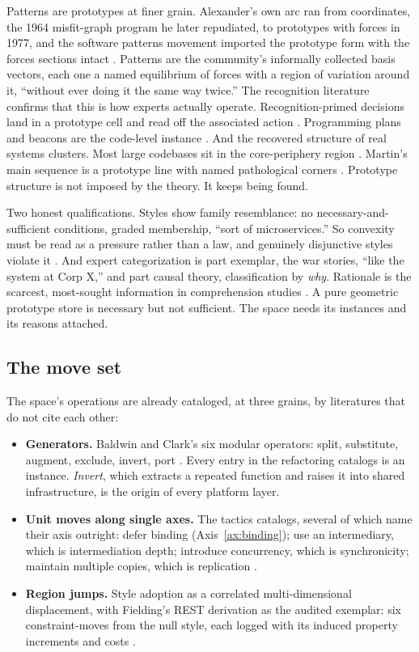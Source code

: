 \documentclass[11pt,oneside]{article}
\theoremstyle{definition}
\begin{document}
Patterns are prototypes at finer grain. Alexander's own arc ran from coordinates, the 1964
misfit-graph program he later repudiated, to prototypes with forces in 1977, and the software
patterns movement imported the prototype form with the forces sections intact
\cite{alexander1977,gamma1994}. Patterns are the community's informally collected basis vectors,
each one a named equilibrium of forces with a region of variation around it, ``without ever
doing it the same way twice.'' The recognition literature confirms that this is how experts
actually operate. Recognition-primed decisions land in a prototype cell and read off the
associated action \cite{klein1998}. Programming plans and beacons are the code-level instance
\cite{soloway1984}. And the recovered structure of real systems clusters. Most large codebases
sit in the core-periphery region \cite{baldwin2014}. Martin's main sequence is a prototype line
with named pathological corners \cite{martin2002}. Prototype structure is not imposed by the
theory. It keeps being found.

Two honest qualifications. Styles show family resemblance: no necessary-and-sufficient
conditions, graded membership, ``sort of microservices.'' So convexity must be read as a
pressure rather than a law, and genuinely disjunctive styles violate it \cite{hernandez2017}.
And expert categorization is part exemplar, the war stories, ``like the system at Corp X,'' and
part causal theory, classification by \emph{why}. Rationale is the scarcest, most-sought
information in comprehension studies \cite{latoza2010}. A pure geometric prototype store is
necessary but not sufficient. The space needs its instances and its reasons attached.

\subsection{The move set}\label{sec:moves}

The space's operations are already cataloged, at three grains, by literatures that do not cite
each other:

\begin{itemize}[leftmargin=1.6em]
\item \textbf{Generators.} Baldwin and Clark's six modular operators: split, substitute,
augment, exclude, invert, port \cite{baldwinclark2000}. Every entry in the refactoring catalogs
is an instance. \emph{Invert}, which extracts a repeated function and raises it into shared
infrastructure, is the origin of every platform layer.
\item \textbf{Unit moves along single axes.} The tactics catalogs, several of which name their
axis outright: defer binding (Axis~\ref{ax:binding}); use an intermediary, which is
intermediation depth; introduce concurrency, which is synchronicity; maintain multiple copies,
which is replication \cite{bass2012}.
\item \textbf{Region jumps.} Style adoption as a correlated multi-dimensional displacement, with
Fielding's REST derivation as the audited exemplar: six constraint-moves from the null style,
each logged with its induced property increments and costs \cite{fielding2000}.
\end{itemize}
\end{document}
